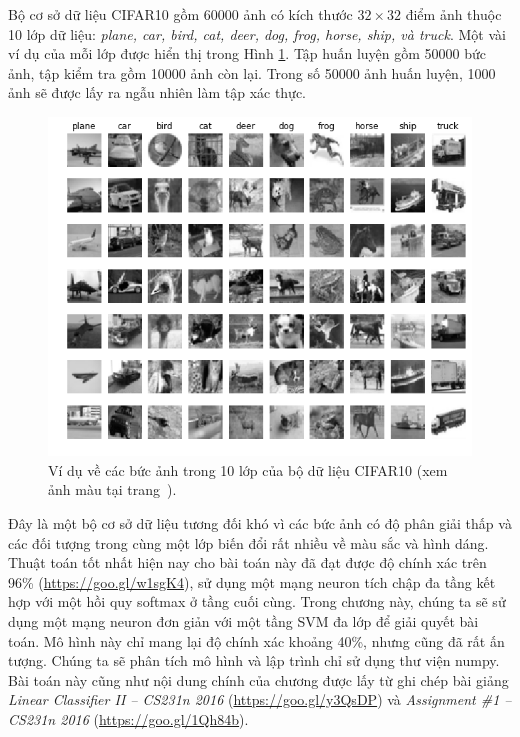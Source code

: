 Bộ cơ sở dữ liệu CIFAR10 gồm 60000 ảnh có kích thước $32 \times 32$ điểm ảnh
thuộc 10 lớp dữ liệu: \textit{plane, car, bird, cat, deer, dog, frog, horse,
ship, và truck}. Một vài ví dụ của mỗi lớp được hiển thị trong Hình \ref{fig:22_2}.
Tập huấn luyện gồm 50000 bức ảnh, tập kiểm tra gồm 10000 ảnh còn lại.
Trong số 50000 ảnh huấn luyện, 1000 ảnh sẽ được lấy ra ngẫu nhiên làm tập xác
thực.
\begin{figure}[t]
\centering
\includegraphics[width = \textwidth]{Chapters/09_SupportVectorMachines/22_multiclasssvm/cifar_gray.png}
\caption[]{Ví dụ về các bức ảnh trong 10 lớp của bộ dữ liệu CIFAR10 (xem ảnh màu tại trang~\pageref{fig:22_2_c}).}
\label{fig:22_2}
\end{figure}
Đây là một bộ cơ sở dữ liệu tương đối khó vì các bức ảnh có độ phân giải thấp và
các đối tượng trong cùng một lớp biến đổi rất nhiều về màu sắc và hình dáng.
Thuật toán tốt nhất hiện nay cho bài toán này đã đạt được độ chính xác trên 96\%
(\url{https://goo.gl/w1sgK4}), sử dụng một mạng neuron tích chập đa tầng kết hợp
với một hồi quy softmax ở tầng cuối cùng. Trong chương này, chúng ta sẽ sử dụng
một mạng neuron đơn giản với một tầng SVM đa lớp để giải quyết bài toán. Mô hình
này chỉ mang lại độ chính xác khoảng 40\%, nhưng cũng đã rất ấn tượng. Chúng ta
sẽ phân tích mô hình và lập trình chỉ sử dụng thư viện numpy. Bài toán này cũng
như nội dung chính của chương được lấy từ ghi chép bài giảng \textit{Linear
Classifier II  --  CS231n 2016} (\url{https://goo.gl/y3QsDP}) và
\textit{Assignment \#1  --  CS231n 2016} (\url{https://goo.gl/1Qh84b}).

